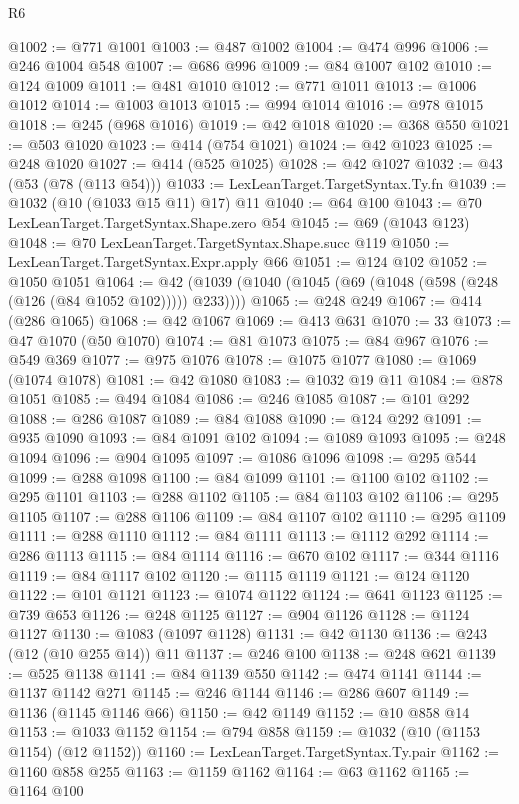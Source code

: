 \begin{lexlean}{R6}
\begin{coremodule}
@1002 := @771 @1001
@1003 := @487 @1002
@1004 := @474 @996
@1006 := @246 @1004 @548
@1007 := @686 @996
@1009 := @84 @1007 @102
@1010 := @124 @1009
@1011 := @481 @1010
@1012 := @771 @1011
@1013 := @1006 @1012
@1014 := @1003 @1013
@1015 := @994 @1014
@1016 := @978 @1015
@1018 := @245 (@968 @1016)
@1019 := @42 @1018
@1020 := @368 @550
@1021 := @503 @1020
@1023 := @414 (@754 @1021)
@1024 := @42 @1023
@1025 := @248 @1020
@1027 := @414 (@525 @1025)
@1028 := @42 @1027
@1032 := @43 (@53 (@78 (@113 @54)))
@1033 := LexLeanTarget.TargetSyntax.Ty.fn
@1039 := @1032 (@10 (@1033 @15 @11) @17) @11
@1040 := @64 @100
@1043 := @70 LexLeanTarget.TargetSyntax.Shape.zero @54
@1045 := @69 (@1043 @123)
@1048 := @70 LexLeanTarget.TargetSyntax.Shape.succ @119
@1050 := LexLeanTarget.TargetSyntax.Expr.apply @66
@1051 := @124 @102
@1052 := @1050 @1051
@1064 := @42 (@1039 (@1040 (@1045 (@69 (@1048 (@598 (@248 (@126 (@84 @1052 @102))))) @233))))
@1065 := @248 @249
@1067 := @414 (@286 @1065)
@1068 := @42 @1067
@1069 := @413 @631
@1070 := 33
@1073 := @47 @1070 (@50 @1070)
@1074 := @81 @1073
@1075 := @84 @967
@1076 := @549 @369
@1077 := @975 @1076
@1078 := @1075 @1077
@1080 := @1069 (@1074 @1078)
@1081 := @42 @1080
@1083 := @1032 @19 @11
@1084 := @878 @1051
@1085 := @494 @1084
@1086 := @246 @1085
@1087 := @101 @292
@1088 := @286 @1087
@1089 := @84 @1088
@1090 := @124 @292
@1091 := @935 @1090
@1093 := @84 @1091 @102
@1094 := @1089 @1093
@1095 := @248 @1094
@1096 := @904 @1095
@1097 := @1086 @1096
@1098 := @295 @544
@1099 := @288 @1098
@1100 := @84 @1099
@1101 := @1100 @102
@1102 := @295 @1101
@1103 := @288 @1102
@1105 := @84 @1103 @102
@1106 := @295 @1105
@1107 := @288 @1106
@1109 := @84 @1107 @102
@1110 := @295 @1109
@1111 := @288 @1110
@1112 := @84 @1111
@1113 := @1112 @292
@1114 := @286 @1113
@1115 := @84 @1114
@1116 := @670 @102
@1117 := @344 @1116
@1119 := @84 @1117 @102
@1120 := @1115 @1119
@1121 := @124 @1120
@1122 := @101 @1121
@1123 := @1074 @1122
@1124 := @641 @1123
@1125 := @739 @653
@1126 := @248 @1125
@1127 := @904 @1126
@1128 := @1124 @1127
@1130 := @1083 (@1097 @1128)
@1131 := @42 @1130
@1136 := @243 (@12 (@10 @255 @14)) @11
@1137 := @246 @100
@1138 := @248 @621
@1139 := @525 @1138
@1141 := @84 @1139 @550
@1142 := @474 @1141
@1144 := @1137 @1142 @271
@1145 := @246 @1144
@1146 := @286 @607
@1149 := @1136 (@1145 @1146 @66)
@1150 := @42 @1149
@1152 := @10 @858 @14
@1153 := @1033 @1152
@1154 := @794 @858
@1159 := @1032 (@10 (@1153 @1154) (@12 @1152))
@1160 := LexLeanTarget.TargetSyntax.Ty.pair
@1162 := @1160 @858 @255
@1163 := @1159 @1162
@1164 := @63 @1162
@1165 := @1164 @100

\end{coremodule}
\end{lexlean}
